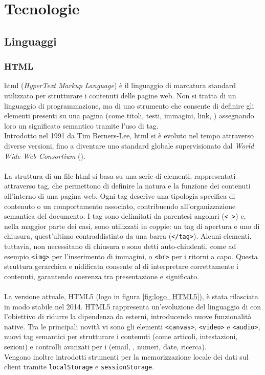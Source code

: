 \chapter{Tecnologie}
\label{chap:linguaggi-tecnologie}

\section{Linguaggi}
\subsection{HTML}
\label{subsec:html}
\noindent \acrshort{html} (\textit{HyperText Markup Language}) è il linguaggio di marcatura standard utilizzato per strutturare i contenuti delle pagine web. Non si tratta di un linguaggio di programmazione, ma di uno strumento che consente di definire gli elementi presenti su una pagina (come titoli, testi, immagini, link, ) assegnando loro un significato semantico tramite l’uso di tag. \\
Introdotto nel 1991 da Tim Berners-Lee, \acrshort{html} si è evoluto nel tempo attraverso diverse versioni, fino a diventare uno standard globale supervisionato dal \textit{World Wide Web Consortium} ().\\
\\
La struttura di un file \acrshort{html} si basa su una serie di elementi, rappresentati attraverso tag, che permettono di definire la natura e la funzione dei contenuti all'interno di una pagina web. Ogni tag descrive una tipologia specifica di contenuto o un comportamento associato, contribuendo all'organizzazione semantica del documento. I tag sono delimitati da parentesi angolari (\texttt{< >}) e, nella maggior parte dei casi, sono utilizzati in coppie: un tag di apertura e uno di chiusura, quest’ultimo contraddistinto da una barra (\texttt{</tag>}). Alcuni elementi, tuttavia, non necessitano di chiusura e sono detti auto-chiudenti, come ad esempio \texttt{<img>} per l’inserimento di immagini, o \texttt{<br>} per i ritorni a capo. Questa struttura gerarchica e nidificata consente al  di interpretare correttamente i contenuti, garantendo coerenza tra presentazione e significato.\\
\\
La versione attuale, HTML5 (logo in figura \ref{fig:logo_HTML5}), è stata rilasciata in modo stabile nel 2014.
HTML5 rappresenta un’evoluzione del linguaggio di  con l’obiettivo di ridurre la dipendenza da  esterni, introducendo nuove funzionalità native. Tra le principali novità vi sono gli elementi \texttt{<canvas>}, \texttt{<video>} e \texttt{<audio>}, nuovi tag semantici per strutturare i contenuti (come articoli, intestazioni, sezioni) e controlli avanzati per i  (email, , numeri, date, ricerca). 
\\Vengono inoltre introdotti strumenti per la memorizzazione locale dei dati sul client tramite \texttt{localStorage} e \texttt{sessionStorage}.

